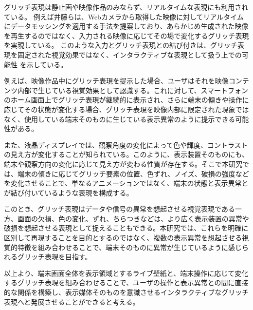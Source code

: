 グリッチ表現は静止画や映像作品のみならず、リアルタイムな表現にも利用されている。
例えば井藤らは、Webカメラから取得した映像に対してリアルタイムにデータモッシングを適用する手法を提案しており、あらかじめ生成された映像を再生するのではなく、入力される映像に応じてその場で変化するグリッチ表現を実現している\cite{ito2013datamoshing}。
このような入力とグリッチ表現との結び付きは、グリッチ表現を固定された視覚効果ではなく、インタラクティブな表現として扱う上での可能性
を示している。


例えば、映像作品中にグリッチ表現を提示した場合、ユーザはそれを映像コンテンツ内部で生じている視覚効果として認識する。これに対して、スマートフォンのホーム画面上でグリッチ表現が継続的に表示され、さらに端末の傾きや操作に応じてその状態が変化する場合、グリッチ表現を映像内部に限定された現象ではなく、使用している端末そのものに生じている表示異常のように提示できる可能性がある。

また、液晶ディスプレイでは、観察角度の変化によって色や輝度、コントラストの見え方が変化することが知られている。このように、表示装置そのものにも、端末や観察方向の変化に応じて見え方が変わる性質が存在する。そこで本研究では、端末の傾きに応じてグリッチ要素の位置、色ずれ、ノイズ、破損の強度などを変化させることで、単なるアニメーションではなく、端末の状態と表示異常とが結び付いているような表現を構成する。

このとき、グリッチ表現はデータや信号の異常を想起させる視覚表現である一方、画面の欠損、色の変化、ずれ、ちらつきなどは、より広く表示装置の異常や破損を想起させる表現として捉えることもできる。本研究では、これらを明確に区別して再現することを目的とするのではなく、複数の表示異常を想起させる視覚的特徴を組み合わせることで、端末そのものに異常が生じているように感じられるグリッチ表現を目指す。

以上より、端末画面全体を表示領域とするライブ壁紙と、端末操作に応じて変化するグリッチ表現を組み合わせることで、ユーザの操作と表示異常との間に直接的な関係を構築し、表示媒体そのものを意識させるインタラクティブなグリッチ表現へと発展させることができると考える。




